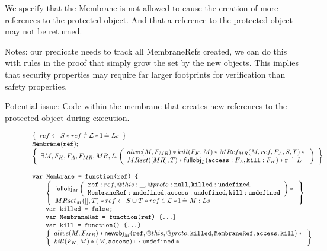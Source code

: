 \documentclass[a4paper]{article}
\begin{document}
We specify that the Membrane is not allowed to cause the creation of more
references to the protected object. And that a reference to the protected object
may not be returned.

Notes: our predicate needs to track all MembraneRefs created, we can do this
with rules in the proof that simply grow the set by the new objects.
This implies that security properties may require far larger footprints for
verification than safety properties.

Potential issue: Code within the membrane that creates new references to the
protected object during execution.

\begin{figure}[b]
  \[
    \begin{array}{l}
      \logic{
        ref \bp S \sep ref \dotin \loc \sep \ls \doteq Ls
      } \\
      \js{Membrane(ref);} \\
      \logic{
        \exists M, F_K, F_A, F_{MR}, MR, L \st \args{
          alive(M, F_{MR}) \sep
          kill(F_K,M) \sep
          MRef_{MR}(M, ref, F_A, S, T) \sep {} \\
          MRset([MR],T) \sep
          \fullobj_L(\js{access}:F_A,\js{kill}:F_K) \sep
          \rv \doteq L
        }
      } \\
      \\
      \tjs{var Membrane = function(ref) \{} \\
        \indblock{
          \logic{
            \fullobj_M \args{
              \js{ref}: ref, @this: \_, @proto: \nil, \js{killed}: \und, \\
              \js{MembraneRef}: \und, \js{access}: \und, \js{kill}: \und
            } \sep {} \\
            MRset_M([], T) \sep
            ref \bp S \cup T \sep
            ref \dotin \loc \sep
            \ls \doteq M:Ls
          } \\
          \tjs{var killed = false;} \\
          \tjs{var MembraneRef = function(ref) \{...\}} \\
          \tjs{var kill = function() \{...\}} \\
          \logic{
            alive(M, F_{MR}) \sep
            \newobj_M(\js{ref},@this,@proto,\js{killed},\js{MembraneRef},
                   \js{access},\js{kill}) \sep {} \\

            kill(F_K,M) \sep
            (M,\js{access}) \pointsto \und \sep {} \\

}}
\end{array}\]
\end{figure}
\end{document}
